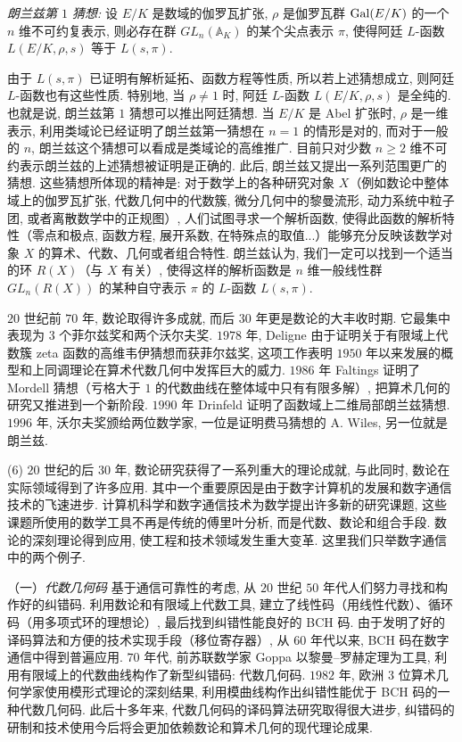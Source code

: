 \emph{朗兰兹第 $1$ 猜想:} 设 $E/K$ 是数域的伽罗瓦扩张, $\rho$ 是伽罗瓦群 $\operatorname{Gal}(E/K)$ 的一个 $n$ 维不可约复表示, 则必存在群 $GL_n(\mathbb{A}_K)$ 的某个尖点表示 $\pi$, 使得阿廷 $L$-函数 $L(E/K,\rho,s)$ 等于 $L(s,\pi)$.

由于 $L(s,\pi)$ 已证明有解析延拓、函数方程等性质, 所以若上述猜想成立, 则阿廷 $L$-函数也有这些性质. 特别地, 当 $\rho\neq 1$ 时, 阿廷 $L$-函数 $L(E/K,\rho,s)$ 是全纯的. 也就是说, 朗兰兹第 $1$ 猜想可以推出阿廷猜想. 当 $E/K$ 是 Abel 扩张时, $\rho$ 是一维表示, 利用类域论已经证明了朗兰兹第一猜想在 $n=1$ 的情形是对的, 而对于一般的 $n$, 朗兰兹这个猜想可以看成是类域论的高维推广. 目前只对少数 $n\geqslant 2$ 维不可约表示朗兰兹的上述猜想被证明是正确的. 此后, 朗兰兹又提出一系列范围更广的猜想. 这些猜想所体现的精神是: 对于数学上的各种研究对象 $X$（例如数论中整体域上的伽罗瓦扩张, 代数几何中的代数簇, 微分几何中的黎曼流形, 动力系统中粒子团, 或者离散数学中的正规图）, 人们试图寻求一个解析函数, 使得此函数的解析特性（零点和极点, 函数方程, 展开系数, 在特殊点的取值...）能够充分反映该数学对象 $X$ 的算术、代数、几何或者组合特性. 朗兰兹认为, 我们一定可以找到一个适当的环 $R(X)$（与 $X$ 有关）, 使得这样的解析函数是 $n$ 维一般线性群 $GL_n(R(X))$ 的某种自守表示 $\pi$ 的 $L$-函数 $L(s,\pi)$.

$20$ 世纪前 $70$ 年, 数论取得许多成就, 而后 $30$ 年更是数论的大丰收时期. 它最集中表现为 $3$ 个菲尔兹奖和两个沃尔夫奖. $1978$ 年, Deligne 由于证明关于有限域上代数簇 zeta 函数的高维韦伊猜想而获菲尔兹奖, 这项工作表明 $1950$ 年以来发展的概型和上同调理论在算术代数几何中发挥巨大的威力. $1986$ 年 Faltings 证明了 Mordell 猜想（亏格大于 $1$ 的代数曲线在整体域中只有有限多解）, 把算术几何的研究又推进到一个新阶段. $1990$ 年 Drinfeld 证明了函数域上二维局部朗兰兹猜想. $1996$ 年, 沃尔夫奖颁给两位数学家, 一位是证明费马猜想的 A. Wiles, 另一位就是朗兰兹.

(6) $20$ 世纪的后 $30$ 年, 数论研究获得了一系列重大的理论成就, 与此同时, 数论在实际领域得到了许多应用. 其中一个重要原因是由于数字计算机的发展和数字通信技术的飞速进步. 计算机科学和数字通信技术为数学提出许多新的研究课题, 这些课题所使用的数学工具不再是传统的傅里叶分析, 而是代数、数论和组合手段. 数论的深刻理论得到应用, 使工程和技术领域发生重大变革. 这里我们只举数字通信中的两个例子.

（一）\emph{代数几何码} 基于通信可靠性的考虑, 从 $20$ 世纪 $50$ 年代人们努力寻找和构作好的纠错码. 利用数论和有限域上代数工具, 建立了线性码（用线性代数）、循环码（用多项式环的理想论）, 最后找到纠错性能良好的 BCH 码. 由于发明了好的译码算法和方便的技术实现手段（移位寄存器）, 从 $60$ 年代以来, BCH 码在数字通信中得到普遍应用. $70$ 年代, 前苏联数学家 Goppa 以黎曼--罗赫定理为工具, 利用有限域上的代数曲线构作了新型纠错码: 代数几何码. $1982$ 年, 欧洲 $3$ 位算术几何学家使用模形式理论的深刻结果, 利用模曲线构作出纠错性能优于 BCH 码的一种代数几何码. 此后十多年来, 代数几何码的译码算法研究取得很大进步, 纠错码的研制和技术使用今后将会更加依赖数论和算术几何的现代理论成果.

